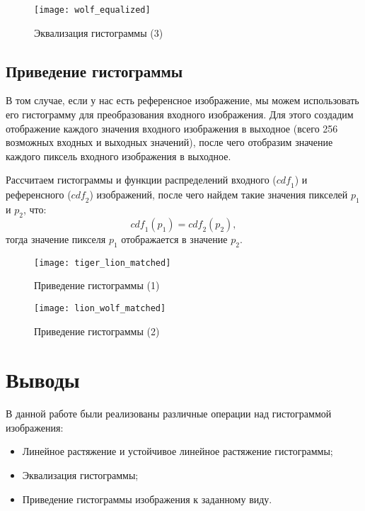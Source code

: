 \begin{figure}[H]
	\centering
	\texttt{[image: wolf\_equalized]}
	\caption{Эквализация гистограммы (3)}
\end{figure}

\subsection{Приведение гистограммы}

В том случае, если у нас есть референсное изображение, мы можем использовать его гистограмму для преобразования входного изображения. Для этого создадим отображение каждого значения входного изображения в выходное (всего 256 возможных входных и выходных значений), после чего отобразим значение каждого пиксель входного изображения в выходное. 

Рассчитаем гистограммы и функции распределений входного ($\mathit{cdf_1}$) и референсного ($\mathit{cdf_2}$) изображений, после чего найдем такие значения пикселей $p_1$ и $p_2$, что:
$$
\mathit{cdf_1}(p_1) = \mathit{cdf_2}(p_2),
$$
тогда значение пикселя $p_1$ отображается в значение $p_2$.

\begin{figure}[H]
	\centering
	\texttt{[image: tiger\_lion\_matched]}
	\caption{Приведение гистограммы (1)}
\end{figure}

\begin{figure}[H]
	\centering
	\texttt{[image: lion\_wolf\_matched]}
	\caption{Приведение гистограммы (2)}
\end{figure}

\section{Выводы}

В данной работе были реализованы различные операции над гистограммой изображения:
\begin{itemize}
	\item Линейное растяжение и устойчивое линейное растяжение гистограммы;
	\item Эквализация гистограммы;
	\item Приведение гистограммы изображения к заданному виду.
\end{itemize}

